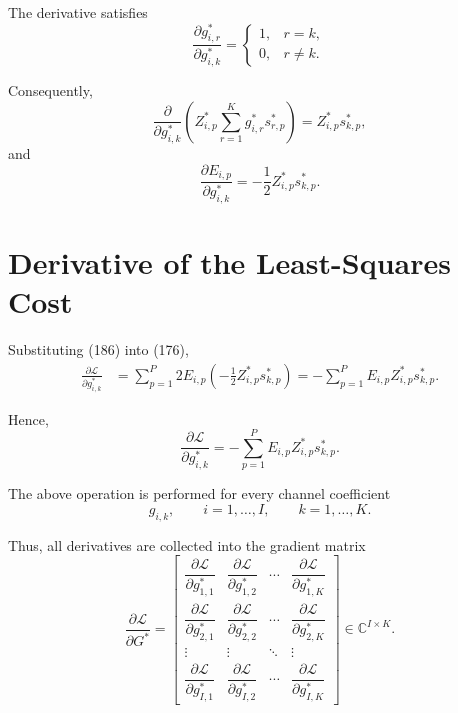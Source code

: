 \documentclass[12pt,a4paper]{article}
\begin{document}
The derivative satisfies
\begin{equation}
\frac{\partial g_{i,r}^*}{\partial g_{i,k}^*}
=
\begin{cases}
1, & r=k,\\
0, & r\neq k.
\end{cases}
\tag{184}
\end{equation}

Consequently,
\begin{equation}
\frac{\partial}{\partial g_{i,k}^*}
\left(
Z_{i,p}^*
\sum_{r=1}^{K}
g_{i,r}^*s_{r,p}^*
\right)
=
Z_{i,p}^*s_{k,p}^*,
\tag{185}
\end{equation}
and
\begin{equation}
\boxed{
\frac{\partial E_{i,p}}{\partial g_{i,k}^*}
=
-\frac{1}{2}
Z_{i,p}^*s_{k,p}^*
}.
\tag{186}
\end{equation}

\section{Derivative of the Least-Squares Cost}

Substituting (186) into (176),
\begin{equation}
\begin{aligned}
\frac{\partial\mathcal L}{\partial g_{i,k}^*}
&=
\sum_{p=1}^{P}
2E_{i,p}
\left(
-\frac{1}{2}
Z_{i,p}^*s_{k,p}^*
\right)
=
-\sum_{p=1}^{P}
E_{i,p}
Z_{i,p}^*s_{k,p}^*.
\end{aligned}
\tag{187}
\end{equation}

Hence,
\begin{equation}
\boxed{
\frac{\partial\mathcal L}{\partial g_{i,k}^*}
=
-\sum_{p=1}^{P}
E_{i,p}
Z_{i,p}^*s_{k,p}^*
}.
\tag{188}
\end{equation}

The above operation is performed for every channel coefficient
\begin{equation}
g_{i,k},
\qquad
i=1,\ldots,I,
\qquad
k=1,\ldots,K.
\tag{189}
\end{equation}

Thus, all derivatives are collected into the gradient matrix
\begin{equation}
\boxed{
\frac{\partial\mathcal L}{\partial G^*}
=
\begin{bmatrix}
\dfrac{\partial\mathcal L}{\partial g_{1,1}^*}
&
\dfrac{\partial\mathcal L}{\partial g_{1,2}^*}
&
\cdots
&
\dfrac{\partial\mathcal L}{\partial g_{1,K}^*}
\\[10pt]
\dfrac{\partial\mathcal L}{\partial g_{2,1}^*}
&
\dfrac{\partial\mathcal L}{\partial g_{2,2}^*}
&
\cdots
&
\dfrac{\partial\mathcal L}{\partial g_{2,K}^*}
\\
\vdots&\vdots&\ddots&\vdots
\\
\dfrac{\partial\mathcal L}{\partial g_{I,1}^*}
&
\dfrac{\partial\mathcal L}{\partial g_{I,2}^*}
&
\cdots
&
\dfrac{\partial\mathcal L}{\partial g_{I,K}^*}
\end{bmatrix}
\in
\mathbb{C}^{I\times K}
}.
\tag{190}
\end{equation}
\end{document}
